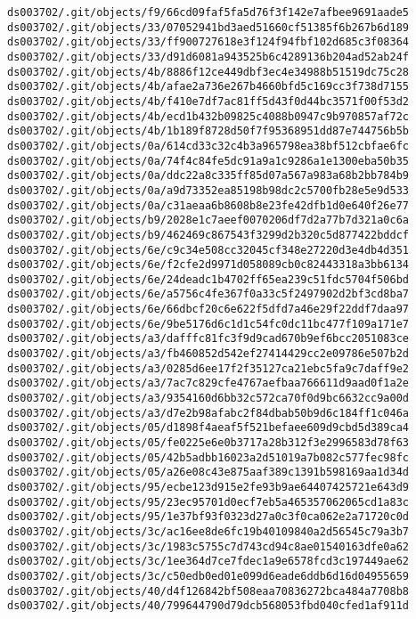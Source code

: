 \documentclass[11pt]{article}
\begin{document}
\begin{Verbatim}[commandchars=\\\{\}]
ds003702/.git/objects/f9/66cd09faf5fa5d76f3f142e7afbee9691aade5
ds003702/.git/objects/33/07052941bd3aed51660cf51385f6b267b6d189
ds003702/.git/objects/33/ff900727618e3f124f94fbf102d685c3f08364
ds003702/.git/objects/33/d91d6081a943525b6c4289136b204ad52ab24f
ds003702/.git/objects/4b/8886f12ce449dbf3ec4e34988b51519dc75c28
ds003702/.git/objects/4b/afae2a736e267b4660bfd5c169cc3f738d7155
ds003702/.git/objects/4b/f410e7df7ac81ff5d43f0d44bc3571f00f53d2
ds003702/.git/objects/4b/ecd1b432b09825c4088b0947c9b970857af72c
ds003702/.git/objects/4b/1b189f8728d50f7f95368951dd87e744756b5b
ds003702/.git/objects/0a/614cd33c32c4b3a965798ea38bf512cbfae6fc
ds003702/.git/objects/0a/74f4c84fe5dc91a9a1c9286a1e1300eba50b35
ds003702/.git/objects/0a/ddc22a8c335ff85d07a567a983a68b2bb784b9
ds003702/.git/objects/0a/a9d73352ea85198b98dc2c5700fb28e5e9d533
ds003702/.git/objects/0a/c31aeaa6b8608b8e23fe42dfb1d0e640f26e77
ds003702/.git/objects/b9/2028e1c7aeef0070206df7d2a77b7d321a0c6a
ds003702/.git/objects/b9/462469c867543f3299d2b320c5d877422bddcf
ds003702/.git/objects/6e/c9c34e508cc32045cf348e27220d3e4db4d351
ds003702/.git/objects/6e/f2cfe2d9971d058089cb0c82443318a3bb6134
ds003702/.git/objects/6e/24deadc1b4702ff65ea239c51fdc5704f506bd
ds003702/.git/objects/6e/a5756c4fe367f0a33c5f2497902d2bf3cd8ba7
ds003702/.git/objects/6e/66dbcf20c6e622f5dfd7a46e29f22ddf7daa97
ds003702/.git/objects/6e/9be5176d6c1d1c54fc0dc11bc477f109a171e7
ds003702/.git/objects/a3/dafffc81fc3f9d9cad670b9ef6bcc2051083ce
ds003702/.git/objects/a3/fb460852d542ef27414429cc2e09786e507b2d
ds003702/.git/objects/a3/0285d6ee17f2f35127ca21ebc5fa9c7daff9e2
ds003702/.git/objects/a3/7ac7c829cfe4767aefbaa766611d9aad0f1a2e
ds003702/.git/objects/a3/9354160d6bb32c572ca70f0d9bc6632cc9a00d
ds003702/.git/objects/a3/d7e2b98afabc2f84dbab50b9d6c184ff1c046a
ds003702/.git/objects/05/d1898f4aeaf5f521befaee609d9cbd5d389ca4
ds003702/.git/objects/05/fe0225e6e0b3717a28b312f3e2996583d78f63
ds003702/.git/objects/05/42b5adbb16023a2d51019a7b082c577fec98fc
ds003702/.git/objects/05/a26e08c43e875aaf389c1391b598169aa1d34d
ds003702/.git/objects/95/ecbe123d915e2fe93b9ae64407425721e643d9
ds003702/.git/objects/95/23ec95701d0ecf7eb5a465357062065cd1a83c
ds003702/.git/objects/95/1e37bf93f0323d27a0c3f0ca062e2a71720c0d
ds003702/.git/objects/3c/ac16ee8de6fc19b40109840a2d56545c79a3b7
ds003702/.git/objects/3c/1983c5755c7d743cd94c8ae01540163dfe0a62
ds003702/.git/objects/3c/1ee364d7ce7fdec1a9e6578fcd3c197449ae62
ds003702/.git/objects/3c/c50edb0ed01e099d6eade6ddb6d16d04955659
ds003702/.git/objects/40/d4f126842bf508eaa70836272bca484a7708b8
ds003702/.git/objects/40/799644790d79dcb568053fbd040cfed1af911d

\end{Verbatim}
\end{document}
